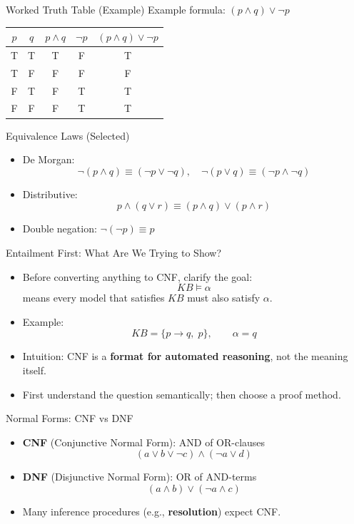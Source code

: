 \documentclass[aspectratio=169]{beamer}
\begin{document}
\begin{frame}{Worked Truth Table (Example)}
  Example formula: $(p \land q) \lor \lnot p$

  \vspace{0.6em}
  \centering
  \begin{tabular}{cc|c|c|c}
    \toprule
    $p$ & $q$ & $p \land q$ & $\lnot p$ & $(p \land q) \lor \lnot p$ \\
    \midrule
    T & T & T & F & T \\
    T & F & F & F & F \\
    F & T & F & T & T \\
    F & F & F & T & T \\
    \bottomrule
  \end{tabular}
\end{frame}

\begin{frame}{Equivalence Laws (Selected)}
  \begin{itemize}[<+->]
    \item De Morgan:
    \[
      \lnot(p \land q) \equiv (\lnot p \lor \lnot q), \quad
      \lnot(p \lor q) \equiv (\lnot p \land \lnot q)
    \]
    \item Distributive:
    \[
      p \land (q \lor r) \equiv (p \land q) \lor (p \land r)
    \]
    \item Double negation: $\lnot(\lnot p) \equiv p$
  \end{itemize}
\end{frame}

\begin{frame}{Entailment First: What Are We Trying to Show?}
  \begin{itemize}[<+->]
    \item Before converting anything to CNF, clarify the goal:
    \[
      KB \models \alpha
    \]
    means every model that satisfies $KB$ must also satisfy $\alpha$.
    \item Example:
    \[
      KB = \{p \rightarrow q,\; p\}, \qquad \alpha = q
    \]
    \item Intuition: CNF is a \textbf{format for automated reasoning}, not the meaning itself.
    \item First understand the question semantically; then choose a proof method.
  \end{itemize}
\end{frame}

\begin{frame}{Normal Forms: CNF vs DNF}
  \begin{itemize}[<+->]
    \item \textbf{CNF} (Conjunctive Normal Form): AND of OR-clauses
    \[
      (a \lor b \lor \lnot c) \land (\lnot a \lor d)
    \]
    \item \textbf{DNF} (Disjunctive Normal Form): OR of AND-terms
    \[
      (a \land b) \lor (\lnot a \land c)
    \]
    \item Many inference procedures (e.g., \textbf{resolution}) expect CNF.
  \end{itemize}
\end{frame}
\end{document}
